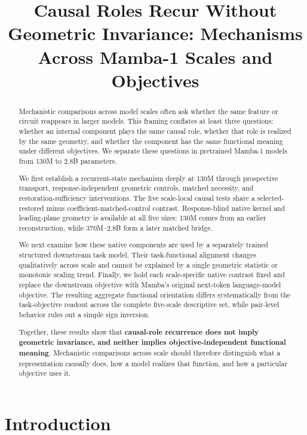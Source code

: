 \documentclass{article}
\title{Causal Roles Recur Without Geometric Invariance: Mechanisms Across Mamba-1 Scales and Objectives}
\author{}
\begin{document}
\maketitle

\begin{abstract}

Mechanistic comparisons across model scales often ask whether the same feature or circuit reappears in larger models. This framing conflates at least three questions: whether an internal component plays the same causal role, whether that role is realized by the same geometry, and whether the component has the same functional meaning under different objectives. We separate these questions in pretrained Mamba-1 models from 130M to 2.8B parameters.

We first establish a recurrent-state mechanism deeply at 130M through prospective transport, response-independent geometric controls, matched necessity, and restoration-sufficiency interventions. The five scale-local causal tests share a selected-restored minus coefficient-matched-control contrast. Response-blind native kernel and leading-plane geometry is available at all five sizes: 130M comes from an earlier reconstruction, while 370M--2.8B form a later matched bridge.

We next examine how these native components are used by a separately trained structured downstream task model. Their task-functional alignment changes qualitatively across scale and cannot be explained by a single geometric statistic or monotonic scaling trend. Finally, we hold each scale-specific native contrast fixed and replace the downstream objective with Mamba's original next-token language-model objective. The resulting aggregate functional orientation differs systematically from the task-objective readout across the complete five-scale descriptive set, while pair-level behavior rules out a simple sign inversion.

Together, these results show that \textbf{causal-role recurrence does not imply geometric invariance, and neither implies objective-independent functional meaning}. Mechanistic comparisons across scale should therefore distinguish what a representation causally does, how a model realizes that function, and how a particular objective uses it.

\end{abstract}
\section{Introduction}
\label{sec:intro}
\end{document}
